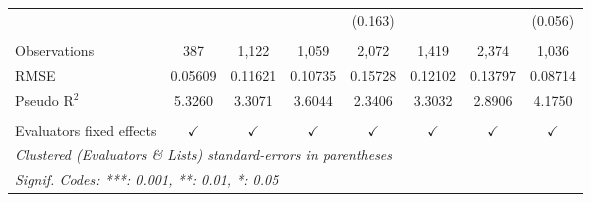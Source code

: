 \begin{tabular}{lccccccc}
                            &               &               &               & (0.163)       &               &               & (0.056)\\   
    \\
   Observations             & 387           & 1,122         & 1,059         & 2,072         & 1,419         & 2,374         & 1,036\\  
   RMSE                     & 0.05609       & 0.11621       & 0.10735       & 0.15728       & 0.12102       & 0.13797       & 0.08714\\  
   Pseudo R$^2$             & 5.3260        & 3.3071        & 3.6044        & 2.3406        & 3.3032        & 2.8906        & 4.1750\\  
    \\
   Evaluators fixed effects & $\checkmark$  & $\checkmark$  & $\checkmark$  & $\checkmark$  & $\checkmark$  & $\checkmark$  & $\checkmark$\\   
   \bottomrule
   \multicolumn{8}{l}{\emph{Clustered (Evaluators \& Lists) standard-errors in parentheses}}\\
   \multicolumn{8}{l}{\emph{Signif. Codes: ***: 0.001, **: 0.01, *: 0.05}}\\
\end{tabular}
\par\endgroup


